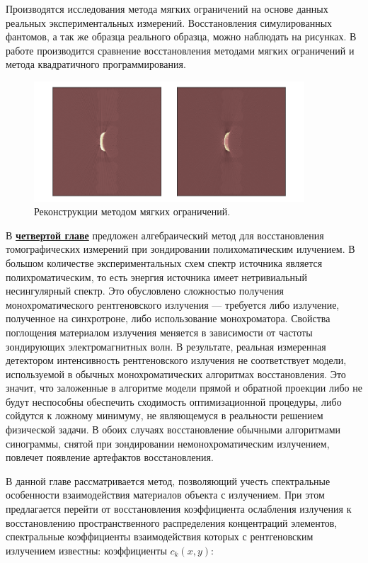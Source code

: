 Производятся исследования метода мягких ограничений на основе данных реальных экспериментальных измерений.
Восстановления симулированных фантомов, а так же образца реального образца, можно наблюдать на рисунках.
В работе производится сравнение восстановления методами мягких ограничений и метода квадратичного программирования.

\begin{figure}
  \centering
  \includegraphics[width=0.9\textwidth]{Dissertation/images/part2_img/sample}
  \caption{Реконструкции методом мягких ограничений.}
  \label{sample}
\end{figure}

В \underline{\textbf{четвертой главе}} предложен алгебраический метод для восстановления томографических измерений при зондировании полихоматическим илучением.
В большом количестве экспериментальных схем спектр источника является полихроматическим, то есть энергия источника имеет нетривиальный несингулярный спектр.
Это обусловлено сложностью получения монохроматического рентгеновского излучения --- требуется либо излучение, полученное на синхротроне, либо использование монохроматора.
Свойства поглощения материалом излучения меняется в зависимости от частоты зондирующих электромагнитных волн.
В результате, реальная измеренная детектором интенсивность рентгеновского излучения не соответствует модели, используемой в обычных монохроматических алгоритмах восстановления.
Это значит, что заложенные в алгоритме модели прямой и обратной проекции либо не будут неспособны обеспечить сходимость оптимизационной процедуры, либо сойдутся к ложному минимуму, не являющемуся в реальности решением физической задачи.
В обоих случаях восстановление обычными алгоритмами синограммы, снятой при зондировании немонохроматическим излучением, повлечет появление артефактов восстановления.

В данной главе рассматривается метод, позволяющий учесть спектральные особенности взаимодействия материалов объекта с излучением.
При этом предлагается перейти от восстановления коэффициента ослабления излучения к восстановлению пространственного распределения концентраций элементов, спектральные коэффициенты взаимодействия которых с рентгеновским излучением известны: коэффициенты $c_k(x,y)$:

